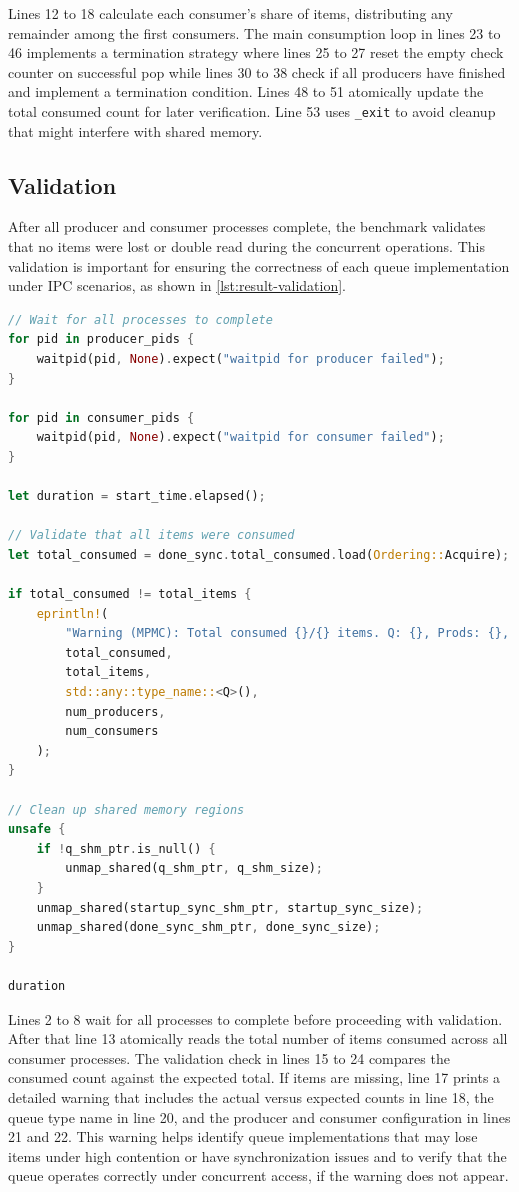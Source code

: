Lines 12 to 18 calculate each consumer's share of items, distributing any remainder among the first consumers. The main consumption loop in lines 23 to 46 implements a termination strategy where lines 25 to 27 reset the empty check counter on successful pop while lines 30 to 38 check if all producers have finished and implement a termination condition. Lines 48 to 51 atomically update the total consumed count for later verification. Line 53 uses \texttt{\_exit} to avoid cleanup that might interfere with shared memory.

\subsection{Validation}
After all producer and consumer processes complete, the benchmark validates that no items were lost or double read during the concurrent operations. This validation is important for ensuring the correctness of each queue implementation under \ac{IPC} scenarios, as shown in \cref{lst:result-validation}.

\begin{lstlisting}[language=Rust, style=boxed, caption={Post-benchmark validation of results}, label={lst:result-validation}]
// Wait for all processes to complete
for pid in producer_pids {
    waitpid(pid, None).expect("waitpid for producer failed");
}

for pid in consumer_pids {
    waitpid(pid, None).expect("waitpid for consumer failed");
}

let duration = start_time.elapsed();

// Validate that all items were consumed
let total_consumed = done_sync.total_consumed.load(Ordering::Acquire);

if total_consumed != total_items {
    eprintln!(
        "Warning (MPMC): Total consumed {}/{} items. Q: {}, Prods: {}, Cons: {}",
        total_consumed,
        total_items,
        std::any::type_name::<Q>(),
        num_producers,
        num_consumers
    );
}

// Clean up shared memory regions
unsafe {
    if !q_shm_ptr.is_null() {
        unmap_shared(q_shm_ptr, q_shm_size);
    }
    unmap_shared(startup_sync_shm_ptr, startup_sync_size);
    unmap_shared(done_sync_shm_ptr, done_sync_size);
}

duration
\end{lstlisting}

Lines 2 to 8 wait for all processes to complete before proceeding with validation. After that line 13 atomically reads the total number of items consumed across all consumer processes. The validation check in lines 15 to 24 compares the consumed count against the expected total. If items are missing, line 17 prints a detailed warning that includes the actual versus expected counts in line 18, the queue type name in line 20, and the producer and consumer configuration in lines 21 and 22. This warning helps identify queue implementations that may lose items under high contention or have synchronization issues and to verify that the queue operates correctly under concurrent access, if the warning does not appear.


